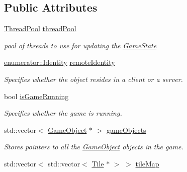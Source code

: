 \subsection*{Public Attributes}
\begin{DoxyCompactItemize}
\item 
\hypertarget{classGameState_a6216ab97827a0f9e932a9d99d528d31e}{\hyperlink{classThreadPool}{Thread\-Pool} \hyperlink{classGameState_a6216ab97827a0f9e932a9d99d528d31e}{thread\-Pool}}\label{classGameState_a6216ab97827a0f9e932a9d99d528d31e}

\begin{DoxyCompactList}\small\item\em pool of threads to use for updating the \hyperlink{classGameState}{Game\-State} \end{DoxyCompactList}\item 
\hypertarget{classGameState_a107b54a0732ffc9d27d344a0185f04e3}{\hyperlink{namespaceenumerator_aa4c03441b2e09279e43235eb80525c6d}{enumerator\-::\-Identity} \hyperlink{classGameState_a107b54a0732ffc9d27d344a0185f04e3}{remote\-Identity}}\label{classGameState_a107b54a0732ffc9d27d344a0185f04e3}

\begin{DoxyCompactList}\small\item\em Specifies whether the object resides in a client or a server. \end{DoxyCompactList}\item 
\hypertarget{classGameState_a86a320f6c311d69651360edf385e677b}{bool \hyperlink{classGameState_a86a320f6c311d69651360edf385e677b}{is\-Game\-Running}}\label{classGameState_a86a320f6c311d69651360edf385e677b}

\begin{DoxyCompactList}\small\item\em Specifies whether the game is running. \end{DoxyCompactList}\item 
\hypertarget{classGameState_a1cdd652d877427e57097eb9b6f1317bf}{std\-::vector$<$ \hyperlink{classGameObject}{Game\-Object} $\ast$ $>$ \hyperlink{classGameState_a1cdd652d877427e57097eb9b6f1317bf}{game\-Objects}}\label{classGameState_a1cdd652d877427e57097eb9b6f1317bf}

\begin{DoxyCompactList}\small\item\em Stores pointers to all the \hyperlink{classGameObject}{Game\-Object} objects in the game. \end{DoxyCompactList}\item 
\hypertarget{classGameState_adf7bef0ce2de87123ee7b132709be3e6}{std\-::vector$<$ std\-::vector$<$ \hyperlink{classTile}{Tile} $\ast$ $>$ $>$ \hyperlink{classGameState_adf7bef0ce2de87123ee7b132709be3e6}{tile\-Map}}\label{classGameState_adf7bef0ce2de87123ee7b132709be3e6}


\end{DoxyCompactItemize}
